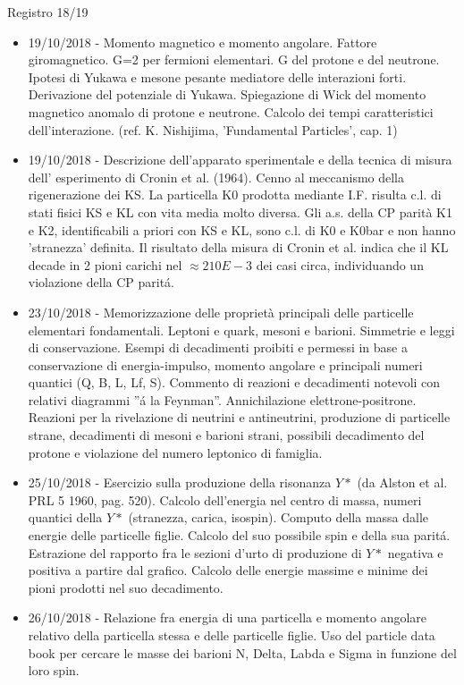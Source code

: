 \begin{frame}[allowframebreaks]{Registro 18/19}
\begin{itemize}
\item 19/10/2018 - Momento magnetico e momento angolare. Fattore giromagnetico. G=2 per fermioni elementari. G del protone e del neutrone. Ipotesi di Yukawa e mesone pesante mediatore delle interazioni forti. Derivazione del potenziale di Yukawa. Spiegazione di Wick del momento magnetico anomalo di protone e neutrone. Calcolo dei tempi caratteristici dell'interazione. (ref. K. Nishijima, 'Fundamental Particles', cap. 1)
\item 19/10/2018 - Descrizione dell'apparato sperimentale e della tecnica di misura dell' esperimento di Cronin et al. (1964). Cenno al meccanismo della rigenerazione dei KS. La particella K0 prodotta mediante I.F. risulta c.l. di stati fisici KS e KL con vita media molto diversa. Gli a.s. della CP parità K1 e K2, identificabili a priori con KS e KL, sono c.l. di K0 e K0bar e non hanno 'stranezza' definita. Il risultato della misura di Cronin et al. indica che il KL decade in 2 pioni carichi nel $\approx2 10E-3$ dei casi circa, individuando un violazione della CP parit\'a.
\item 23/10/2018 - Memorizzazione delle proprietà principali delle particelle elementari fondamentali. Leptoni e quark, mesoni e barioni. Simmetrie e leggi di conservazione. Esempi di decadimenti proibiti e permessi in base a conservazione di energia-impulso, momento angolare e principali numeri quantici (Q, B, L, Lf, S). Commento di reazioni e decadimenti notevoli con relativi diagrammi ''\'a la Feynman''. Annichilazione elettrone-positrone. Reazioni per la rivelazione di neutrini e antineutrini, produzione di particelle strane, decadimenti di mesoni e barioni strani, possibili decadimento del protone e violazione del numero leptonico di famiglia.
\item 25/10/2018 - Esercizio sulla produzione della risonanza $Y*$ (da Alston et al. PRL 5 1960, pag. 520). Calcolo dell'energia nel centro di massa, numeri quantici della $Y*$ (stranezza, carica, isospin). Computo della massa dalle energie delle particelle figlie. Calcolo del suo possibile spin e della sua parit\'a. Estrazione del rapporto fra le sezioni d’urto di produzione di $Y*$ negativa e positiva a partire dal grafico. Calcolo delle energie massime e minime dei pioni prodotti nel suo decadimento.
\item 26/10/2018 - Relazione fra energia di una particella e momento angolare relativo della particella stessa e delle particelle figlie. Uso del particle data book per cercare le masse dei barioni N, Delta, Labda e Sigma in funzione del loro spin.

\end{itemize}
\end{frame}

